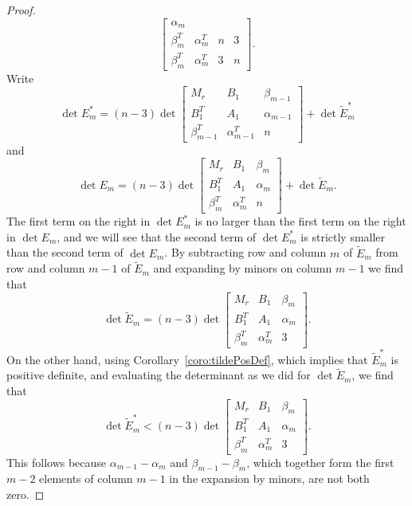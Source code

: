 \documentclass[11pt,a4paper]{article}
\begin{document}
\begin{proof}
\begin{equation*}
\begin{bmatrix}
\alpha_m\\ \beta_m^T & \alpha_m^T & n & 3\\\beta_m^T & \alpha_m^T & 3 &
n\end{bmatrix}.
\end{equation*}
Write
\begin{equation*}
\det E_m^*=(n-3)\det\begin{bmatrix}M_r & 
B_1 & \beta_{m-1}\\ B_1^T & A_1 & \alpha_{m-1}\\ \beta_{m-1}^T & 
\alpha_{m-1}^T & n\end{bmatrix}+\det\tilde E_m^*
\end{equation*}
and
\begin{equation*}
\det E_m=(n-3)\det\begin{bmatrix}M_r & B_1 & \beta_m\\ B_1^T & A_1 & 
\alpha_m\\ \beta_m^T & \alpha_m^T & n\end{bmatrix}+\det\tilde E_m.
\end{equation*}
The first term on the right in $\det E_m^*$ is no larger than the first term
on the right in $\det E_m$, and we will see that the second term of $\det
E_m^*$ is strictly smaller than the second term of $\det E_m$.  By
subtracting row and column $m$ of $\tilde E_m$ from row and column $m-1$ of
$\tilde E_m$ and expanding by minors on column $m-1$ we find that
\begin{equation*}
\det\tilde E_m=(n-3)\det\begin{bmatrix}M_r & B_1 & \beta_m\\ B_1^T & 
A_1 & \alpha_m\\ \beta_m^T & \alpha_m^T & 3\end{bmatrix}.
\end{equation*}
On the other hand, using Corollary~\ref{coro:tildePosDef}, which implies
that $\tilde E_m^*$ is positive definite, and evaluating the determinant as
we did for $\det\tilde E_m$, we find that
\begin{equation*}
\det\tilde E_m^*<(n-3)\det\begin{bmatrix}M_r & B_1 & \beta_m\\ B_1^T & 
A_1 & \alpha_m\\ \beta_m^T & \alpha_m^T & 3\end{bmatrix}.
\end{equation*}
This follows because $\alpha_{m-1}-\alpha_m$ and $\beta_{m-1}-\beta_m$,
which together form the first $m-2$ elements of column $m-1$ in the
expansion by minors, are not both zero.
\end{proof}
\end{document}
